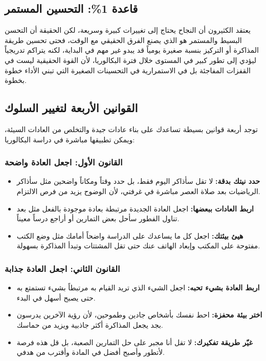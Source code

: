 \documentclass[12pt,a4paper]{book}
\begin{document}
\subsection{قاعدة 1\%: التحسين المستمر}
\label{sec:ta7sin}

يعتقد الكثيرون أن النجاح يحتاج إلى تغييرات كبيرة وسريعة، لكن الحقيقة أن التحسن البسيط والمستمر هو الذي يصنع الفرق الحقيقي مع الوقت، فحتى تحسين طريقة المذاكرة أو التركيز بنسبة صغيرة يومياً قد يبدو غير مهم في البداية، لكنه يتراكم تدريجياً ليؤدي إلى تطور كبير في المستوى خلال فترة البكالوريا، لأن القوة الحقيقية ليست في القفزات المفاجئة بل في الاستمرارية في التحسينات الصغيرة التي تبني الأداء خطوة بخطوة.

\subsection{القوانين الأربعة لتغيير السلوك}
\label{sec:four-laws-behavior}

توجد أربعة قوانين بسيطة تساعدك على بناء عادات جيدة والتخلص من العادات السيئة، ويمكن تطبيقها مباشرة في دراسة البكالوريا:

\subsubsection{القانون الأول: اجعل العادة واضحة}

\begin{itemize}
	\item \textbf{حدد نيتك بدقة:} لا تقل سأذاكر اليوم فقط، بل حدد وقتاً ومكاناً واضحين مثل سأذاكر الرياضيات بعد صلاة العصر مباشرة في غرفتي، لأن الوضوح يزيد من فرص الالتزام.
	
	\item \textbf{اربط العادات ببعضها:} اجعل العادة الجديدة مرتبطة بعادة موجودة بالفعل مثل بعد تناول الفطور سأحل بعض التمارين أو أراجع درساً معيناً.
	
	\item \textbf{هيئ بيئتك:} اجعل كل ما يساعدك على الدراسة واضحاً أمامك مثل وضع الكتب مفتوحة على المكتب وإبعاد الهاتف عنك حتى تقل المشتتات وتبدأ المذاكرة بسهولة.
\end{itemize}

\subsubsection{القانون الثاني: اجعل العادة جذابة}

\begin{itemize}
	\item \textbf{اربط العادة بشيء تحبه:} اجعل الشيء الذي تريد القيام به مرتبطاً بشيء تستمتع به حتى يصبح أسهل في البدء.
	
	\item \textbf{اختر بيئة محفزة:} احط نفسك بأشخاص جادين وطموحين، لأن رؤية الآخرين يدرسون بجد يجعل المذاكرة أكثر جاذبية ويزيد من حماسك.
	
	\item \textbf{غيّر طريقة تفكيرك:} لا تقل أنا مجبر على حل التمارين الصعبة، بل قل هذه فرصة لأتطور وأصبح أفضل في المادة وأقترب من هدفي.
\end{itemize}
\end{document}
